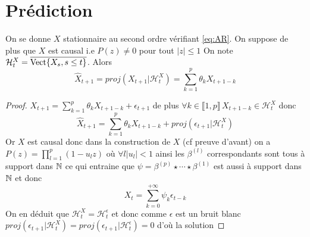 \documentclass{report}
\begin{document}
\section{Prédiction}
\begin{Prop}
On se donne $X$ stationnaire au second ordre vérifiant \eqref{eq:AR}. On suppose de plus que $X$ est causal i.e $P(z) \neq 0$ pour tout $|z| \leq 1$
On note $\mathcal{H}_t^X = \overline{\mathrm{Vect}{ \left\lbrace X_s, s\leq t \right\rbrace }}$. Alors
\[ \hat{X}_{t+1} = proj(X_{t+1} | \mathcal{H}_t^X ) = \sum_{k=1}^p \theta_k X_{t+1-k} \]
\end{Prop}
\begin{proof}
$X_{t+1} = \sum_{k=1}^p \theta_k X_{t+1-k} +\epsilon_{t+1}$ de plus $\forall k \in \llbracket 1,p \rrbracket \, X_{t+1-k} \in \mathcal{H}_t^X$ donc
\[ \hat{X}_{t+1} = \sum_{k=1}^p \theta_k X_{t+1-k} + proj(\epsilon_{t+1} | \mathcal{H}_t^X ) \]
Or $X$ est causal donc dans la construction de $X$ (cf preuve d'avant) on a $P(z)= \prod_{l=1}^p (1-u_l z)$ où $\forall l |u_l|<1$ ainsi les $\beta^{(l)}$ correspondants sont tous à support dans $\mathbb{N}$ ce qui entraine que $\psi = \beta^{(p)} \star \cdots \star \beta^{(1)}$ est aussi à support dans $\mathbb{N}$ et donc 
\[ X_t = \sum_{k=0}^{+\infty} \psi_k \epsilon_{t-k}\] On en déduit que $\mathcal{H}_t^X = \mathcal{H}_t^\epsilon$ et donc comme $\epsilon$ est un bruit blanc $proj(\epsilon_{t+1} | \mathcal{H}_t^X ) = proj(\epsilon_{t+1} | \mathcal{H}_t^\epsilon ) = 0$ d'où la solution
\end{proof}
\end{document}
